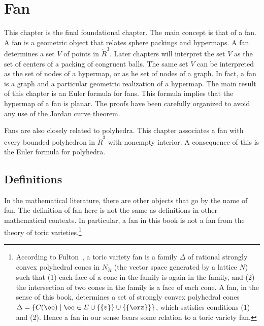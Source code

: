 \chapter{Fan}\label{sec:fan}




\begin{summary}
This chapter is the final foundational chapter.  The main concept is
that of a fan.  A fan is a geometric object that relates
 sphere packings and hypermaps.  A fan determines a set $V$
of points in $\ring{R}^3$.  Later chapters will interpret the set
$V$ as the set of centers of a packing of congruent balls.  The same
set $V$ can be interpreted as the set of nodes of a hypermap, or as
he set of nodes of a graph.  In fact, a fan is a graph and a
particular geometric realization of a hypermap.  The main result of this chapter is
an Euler formula for fans.  This formula implies that the hypermap
of a fan is planar.  The proofs have been carefully organized to
avoid any use of the Jordan curve theorem.


Fans are also closely related to polyhedra.  This chapter associates a
fan with every bounded polyhedron in $\ring{R}^3$ with nonempty
interior.  A consequence of this is the Euler formula for polyhedra.
\end{summary}


%
%
%
%
%

\section{Definitions}



\begin{remark}
  In the mathematical literature, there are other  objects that go
  by the name of fan.  The definition of fan here is not the same as
  definitions in other mathematical contexts.  In particular, a fan in
  this book is not a fan from the theory of toric
  varieties.\footnote{According to
    Fulton~\cite{unknown}, %
    a toric variety fan is a family $\Delta$ of rational strongly convex polyhedral
    cones in $N_{\ring{R}}$ (the vector space generated by a lattice $N$)
   such that (1) each face of a cone
    in the family is again in the family, and (2) the intersection of
    two cones in the family is a face of each cone.  A fan, in the sense
    of this book, determines a set of strongly convex polyhedral cones
    $\Delta = \{ C(\ee)\mid \ee\in E\cup \{ \{v \} \} \cup \{ \{
    \orz\} \} \}$, which satisfies conditions (1) and (2).  Hence a fan
    in our sense bears some relation to a toric variety fan.}
\end{remark}

